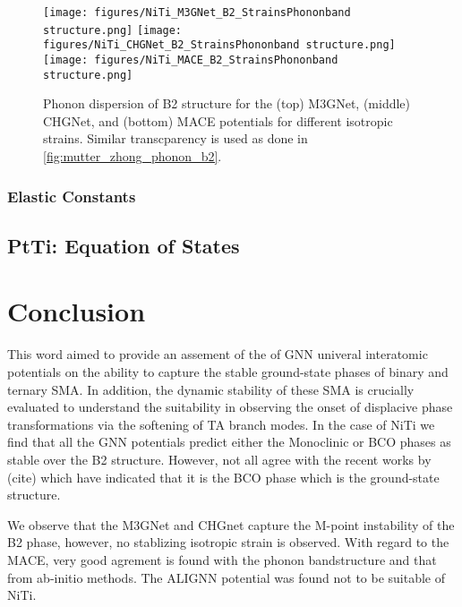 \documentclass[preprint,colorlinks=true,linkcolor=black,citecolor=black]{elsarticle}
\begin{document}
\begin{figure}[!htp]
	\begin{centering}
		\texttt{[image: figures/NiTi\_M3GNet\_B2\_StrainsPhononband structure.png]}
		\vspace{1mm}
		\texttt{[image: figures/NiTi\_CHGNet\_B2\_StrainsPhononband structure.png]}
		\vspace{1mm}
		\texttt{[image: figures/NiTi\_MACE\_B2\_StrainsPhononband structure.png]}
		\caption{ Phonon dispersion of B2 structure for the (top) M3GNet,
			(middle) CHGNet, and (bottom) MACE potentials for different
			isotropic strains. Similar transcparency is used as done in
			\ref{fig:mutter_zhong_phonon_b2}.  }
		\label{fig:gnn_phonon_b2}
	\end{centering}
\end{figure}


\subsubsection{Elastic Constants}


\subsection{PtTi: Equation of States}
\label{sec:ptti_eos}

\section{Conclusion}
\label{sec:conclusion}
This word aimed to provide an assement of the of GNN univeral
interatomic potentials on the ability to capture the stable
ground-state phases of binary and ternary SMA. In addition, the
dynamic stability of these SMA is crucially evaluated to understand
the suitability in observing the onset of displacive phase
transformations via the softening of TA branch modes. In the case of
NiTi we find that all the GNN potentials predict either the Monoclinic
or BCO phases as stable over the B2 structure. However, not all agree
with the recent works by (cite) which have indicated that it is the
BCO phase which is the ground-state structure.

We observe that the M3GNet and CHGnet capture the M-point instability
of the B2 phase, however, no stablizing isotropic strain is
observed. With regard to the MACE, very good agrement is found with
the phonon bandstructure and that from ab-initio methods. The ALIGNN
potential was found not to be suitable of NiTi.
\end{document}
